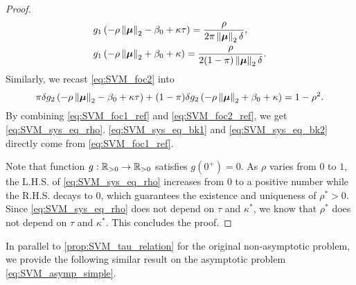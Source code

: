\begin{proof}
\begin{equation}
\label{eq:SVM_foc1_ref}
\begin{aligned}
	& g_1 \left( - \rho \left\|{\text{\boldmath $\mu$}}\right\|_2 - \beta_0 + \kappa \tau \right) = \frac{\rho}{2 \pi \left\|{\text{\boldmath $\mu$}}\right\|_2 \delta}, \\
	& g_1 \left( - \rho \left\|{\text{\boldmath $\mu$}}\right\|_2 + \beta_0 + \kappa \right) = \frac{\rho}{2 (1 - \pi) \left\|{\text{\boldmath $\mu$}}\right\|_2 \delta}.
\end{aligned}
\end{equation}
Similarly, we recast \cref{eq:SVM_foc2} into
\begin{equation}
\label{eq:SVM_foc2_ref}
    \pi \delta g_2 \left( - \rho \left\|{\text{\boldmath $\mu$}}\right\|_2 - \beta_0 + \kappa \tau \right) 
    + (1-\pi) \delta g_2 \left( - \rho \left\|{\text{\boldmath $\mu$}}\right\|_2 + \beta_0 + \kappa \right) = 1 - \rho^2.
\end{equation}
By combining \cref{eq:SVM_foc1_ref} and \eqref{eq:SVM_foc2_ref}, we get \cref{eq:SVM_sys_eq_rho}. \cref{eq:SVM_sys_eq_bk1} and \eqref{eq:SVM_sys_eq_bk2} directly come from \cref{eq:SVM_foc1_ref}.

Note that function $g: \mathbb{R}_{> 0} \to \mathbb{R}_{ > 0}$ satisfies $g(0^+) = 0$. As $\rho$ varies from $0$ to $1$, the L.H.S. of \cref{eq:SVM_sys_eq_rho} increases from $0$ to a positive number while the R.H.S. decays to $0$, which guarantees the existence and uniqueness of $\rho^* > 0$. Since \cref{eq:SVM_sys_eq_rho} does not depend on $\tau$ and $\kappa^*$, we know that $\rho^*$ does not depend on $\tau$ and $\kappa^*$. This concludes the proof.
\end{proof}

In parallel to \cref{prop:SVM_tau_relation} for the original non-asymptotic problem, we provide the following similar result on the asymptotic problem \cref{eq:SVM_asymp_simple}.

